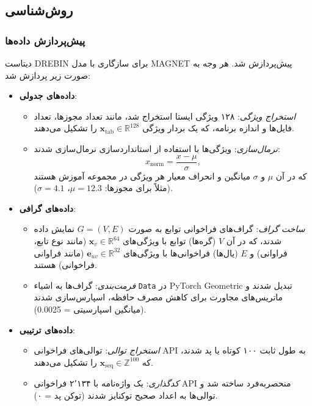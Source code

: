\subsection{روش‌شناسی}

\subsubsection{پیش‌پردازش داده‌ها}
دیتاست DREBIN برای سازگاری با مدل MAGNET پیش‌پردازش شد. هر وجه به صورت زیر پردازش شد:

\begin{itemize}
    \item \textbf{داده‌های جدولی}:
        \begin{itemize}
            \item \textit{استخراج ویژگی}: ۱۲۸ ویژگی ایستا استخراج شد، مانند تعداد مجوزها، تعداد فایل‌ها و اندازه برنامه، که یک بردار ویژگی \( \mathbf{x}_{\text{tab}} \in \mathbb{R}^{128} \) را تشکیل می‌دهند.
            \item \textit{نرمال‌سازی}: ویژگی‌ها با استفاده از استانداردسازی نرمال‌سازی شدند:
            \[
            x_{\text{norm}} = \frac{x - \mu}{\sigma},
            \]
            که در آن \( \mu \) و \( \sigma \) میانگین و انحراف معیار هر ویژگی در مجموعه آموزش هستند (مثلاً برای مجوزها: \( \mu = 12.3 \)، \( \sigma = 4.1 \)).
        \end{itemize}
    \item \textbf{داده‌های گرافی}:
        \begin{itemize}
            \item \textit{ساخت گراف}: گراف‌های فراخوانی توابع به صورت \( G = (V, E) \) نمایش داده شدند، که در آن \( V \) (گره‌ها) توابع با ویژگی‌های \( \mathbf{x}_v \in \mathbb{R}^{64} \) (مانند نوع تابع، فراوانی) و \( E \) (یال‌ها) فراخوانی‌ها با ویژگی‌های \( \mathbf{e}_{uv} \in \mathbb{R}^{32} \) (مانند فراوانی فراخوانی) هستند.
            \item \textit{فرمت‌بندی}: گراف‌ها به اشیاء \texttt{Data} در PyTorch Geometric تبدیل شدند و ماتریس‌های مجاورت برای کاهش مصرف حافظه، اسپارس‌سازی شدند (میانگین اسپارسیتی = 0.0025).
        \end{itemize}
    \item \textbf{داده‌های ترتیبی}:
        \begin{itemize}
            \item \textit{استخراج توالی}: توالی‌های فراخوانی API به طول ثابت ۱۰۰ کوتاه یا پد شدند، که \( \mathbf{x}_{\text{seq}} \in \mathbb{Z}^{100} \) را تشکیل می‌دهند.
            \item \textit{کدگذاری}: یک واژه‌نامه با ۲٬۱۳۴ فراخوانی API منحصربه‌فرد ساخته شد و توالی‌ها به اعداد صحیح توکنایز شدند (توکن پد = ۰).
        \end{itemize}
\end{itemize}

